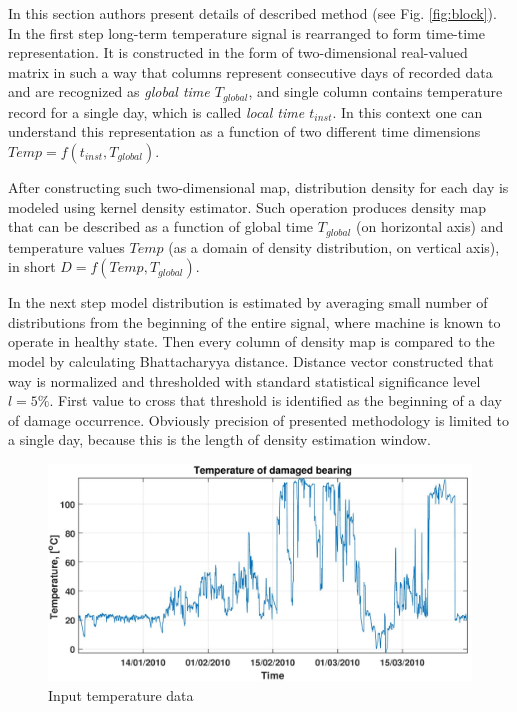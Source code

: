 \documentclass{svproc}
\begin{document}
In this section authors present details of described method (see Fig. \ref{fig:block}). In the first step long-term temperature signal is rearranged to form time-time representation. It is constructed in the form of two-dimensional real-valued matrix in such a way that columns represent consecutive days of recorded data and are recognized as \emph{global time $T_{global}$}, and single column contains temperature record for a single day, which is called \emph{local time $t_{inst}$}. In this context one can understand this representation as a function of two different time dimensions $Temp=f(t_{inst},T_{global})$.

After constructing such two-dimensional map, distribution density for each day is modeled using kernel density estimator. Such operation produces density map that can be described as a function of global time $T_{global}$ (on horizontal axis) and temperature values $Temp$ (as a domain of density distribution, on vertical axis), in short $D=f(Temp,T_{global})$. 

In the next step model distribution is estimated by averaging small number of distributions from the beginning of the entire signal, where machine is known to operate in healthy state. Then every column of density map is compared to the model by calculating Bhattacharyya distance. Distance vector constructed that way is normalized and thresholded with standard statistical significance level $l=5\%$. First value to cross that threshold is identified as the beginning of a day of damage occurrence. Obviously precision of presented methodology is limited to a single day, because this is the length of density estimation window.

\begin{figure}[ht!]
\centering
\includegraphics[width=\textwidth]{figs/Fig03.jpg}
\vspace*{-15pt}
\caption{Input temperature data}
\vspace*{-10pt}
\label{fig:raw}
\end{figure}
\end{document}
